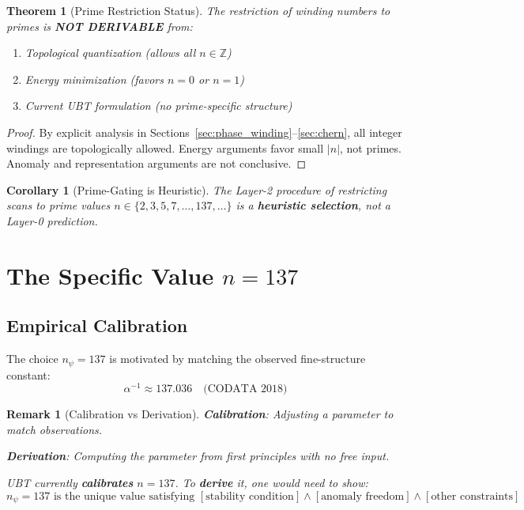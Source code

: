 \documentclass[12pt]{article}
\newtheorem{theorem}[definition]{Theorem}
\newtheorem{remark}[definition]{Remark}
\newtheorem{corollary}[definition]{Corollary}
\newcommand{\Z}{\mathbb{Z}}
\begin{document}
\begin{theorem}[Prime Restriction Status]
\label{thm:primes_not_derived}
The restriction of winding numbers to primes is \textbf{NOT DERIVABLE} from:
\begin{enumerate}
    \item Topological quantization (allows all $n \in \Z$)
    \item Energy minimization (favors $n=0$ or $n=1$)
    \item Current UBT formulation (no prime-specific structure)
\end{enumerate}
\end{theorem}

\begin{proof}
By explicit analysis in Sections~\ref{sec:phase_winding}--\ref{sec:chern}, all integer windings are topologically allowed. Energy arguments favor small $|n|$, not primes. Anomaly and representation arguments are not conclusive.
\end{proof}

\begin{corollary}[Prime-Gating is Heuristic]
The Layer-2 procedure of restricting scans to prime values $n \in \{2, 3, 5, 7, \ldots, 137, \ldots\}$ is a \textbf{heuristic selection}, not a Layer-0 prediction.
\end{corollary}

\section{The Specific Value $n=137$}
\label{sec:n137}

\subsection{Empirical Calibration}

The choice $n_\psi = 137$ is motivated by matching the observed fine-structure constant:
\begin{equation}
\alpha^{-1} \approx 137.036 \quad \text{(CODATA 2018)}
\end{equation}

\begin{remark}[Calibration vs Derivation]
\textbf{Calibration}: Adjusting a parameter to match observations.

\textbf{Derivation}: Computing the parameter from first principles with no free input.

UBT currently \textbf{calibrates} $n=137$. To \textbf{derive} it, one would need to show:
\begin{equation}
n_\psi = 137 \text{ is the unique value satisfying } [\text{stability condition}] \wedge [\text{anomaly freedom}] \wedge [\text{other constraints}]
\end{equation}
\end{remark}
\end{document}
